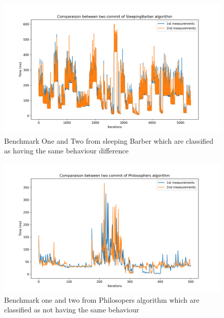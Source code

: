 \documentclass[12pt,a4paper]{article}
\begin{document}
\begin{figure}[]
    \centering
    \includegraphics[width=1\textwidth]{images/plot_SleepingBarber_4.069999999999936.png}
    \caption{Benchmark One and Two from sleeping Barber which are classified as having the same behaviour difference}
    \label{fig:bench_1_2_1}
\end{figure}

\begin{figure}[]
    \centering
    \includegraphics[width=1\textwidth]{images/plot_Philosophers_42.533000000000015.png}
    \caption{Benchmark one and two from Philosopers algorithm which are classified as not having the same behaviour}
    \label{fig:bench_1_2_2}
\end{figure}
\end{document}
